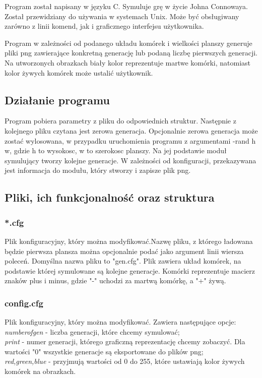\documentclass{article}
\begin{document}
Program został napisany w języku C. Symuluje grę w życie Johna Connowaya.  Został przewidziany do używania w systemach Unix. Może być obsługiwany zarówno z linii komend, jak i graficznego interfejsu użytkownika.

Program w zależności od podanego układu komórek i wielkości planszy generuje pliki png zawierające konkretną generację lub podaną liczbę pierwszych generacji. Na utworzonych obrazkach biały kolor reprezentuje martwe komórki, natomiast kolor żywych komórek może ustalić użytkownik.
\subsection*{Działanie programu}
Program pobiera parametry z pliku do odpowiednich struktur. Następnie z kolejnego pliku czytana jest zerowa generacja. Opcjonalnie zerowa generacja może zostać wylosowana, w przypadku uruchomienia programu z argumentami -rand h w, gdzie h to wysokosc, w to szerokosc planszy. Na jej podstawie moduł symulujący tworzy kolejne generacje. W zależności od konfiguracji, przekazywana jest informacja do modułu, który stworzy i zapisze plik
png.
\subsection*{Pliki, ich funkcjonalność oraz struktura}
\subsubsection*{*.cfg}
Plik konfiguracyjny, który można modyfikować.Nazwę pliku, z którego ładowana będzie pierwsza plansza można opcjonalnie podać jako argument linii wiersza poleceń. Domyślna nazwa pliku to "gen.cfg".
Plik zawiera układ komórek, na podstawie której symulowane są kolejne generacje. Komórki reprezentuje macierz znaków plus i minus, gdzie "-" uchodzi za martwą komórkę, a "+" żywą.
\subsubsection*{config.cfg}
Plik konfiguracyjny, który można modyfikować. Zawiera następujące opcje:\\
\emph{numberofgen }- liczba generacji, które chcemy symulować;\\
\emph{print} - numer generacji, którego graficzną reprezentację chcemy zobaczyć. Dla wartości "0" wszystkie generacje są eksportowane do plików png;\\
\emph{red,green,blue} - przyjmują wartości  od 0 do 255, które ustawiają kolor żywych komórek na obrazkach.
\end{document}
